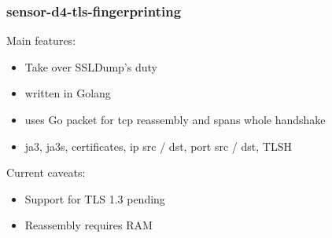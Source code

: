 \documentclass{beamer}
\begin{document}
\begin{frame}
        \frametitle{sensor-d4-tls-fingerprinting}
        Main features:
        \begin{itemize}
          \item Take over SSLDump's duty
          \item written in Golang 
          \item uses Go packet for tcp reassembly and spans whole handshake
          \item ja3, ja3s, certificates, ip src / dst, port src / dst, TLSH
        \end{itemize}
        Current caveats:
        \begin{itemize}
          \item Support for TLS 1.3 pending
          \item Reassembly requires RAM
        \end{itemize}
\end{frame}
\end{document}
